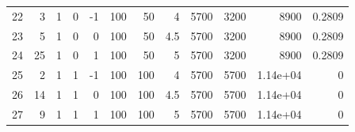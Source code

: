 \begin{table}
\begin{tabular}{rrrrrrrrrrrr}
22 & 3 & 1 & 0 & -1 & 100 & 50 & 4 & 5700 & 3200 & 8900 & 0.2809 \\
23 & 5 & 1 & 0 & 0 & 100 & 50 & 4.5 & 5700 & 3200 & 8900 & 0.2809 \\
24 & 25 & 1 & 0 & 1 & 100 & 50 & 5 & 5700 & 3200 & 8900 & 0.2809 \\
25 & 2 & 1 & 1 & -1 & 100 & 100 & 4 & 5700 & 5700 & 1.14e+04 & 0 \\
26 & 14 & 1 & 1 & 0 & 100 & 100 & 4.5 & 5700 & 5700 & 1.14e+04 & 0 \\
27 & 9 & 1 & 1 & 1 & 100 & 100 & 5 & 5700 & 5700 & 1.14e+04 & 0 \\
\bottomrule
\end{tabular}
\end{table}
